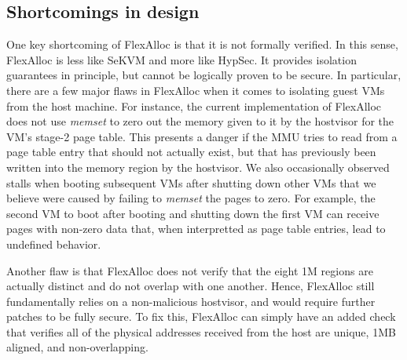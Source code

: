 \subsection{Shortcomings in design}

One key shortcoming of FlexAlloc is that it is not formally verified. In
this sense, FlexAlloc is less like SeKVM and more like HypSec. It provides isolation guarantees
in principle, but cannot be logically proven to be secure. In particular, there
are a few major flaws in FlexAlloc when it comes to isolating guest VMs from
the host machine. For instance, the current implementation of FlexAlloc
does not use \textit{memset} to zero out the memory given to it by the hostvisor
for the VM's stage-2 page table. This presents a danger if the MMU tries to
read from a page table entry that should not actually exist, but that has
previously been written into the memory region by the hostvisor. We also occasionally
observed stalls when booting subsequent VMs after shutting down other VMs that we
believe were caused by failing to \textit{memset} the pages to zero. For example, the second
VM to boot after booting and shutting down the first VM can receive pages with non-zero data
that, when interpretted as page table entries, lead to undefined behavior.

Another flaw is that
FlexAlloc does not verify that the eight 1M regions are actually distinct and
do not overlap with one another. Hence, FlexAlloc still fundamentally relies on
a non-malicious hostvisor, and would require further patches to be fully secure.
To fix this, FlexAlloc can simply have an added check that verifies all of the
physical addresses received from the host are unique, 1MB aligned, and non-overlapping.


